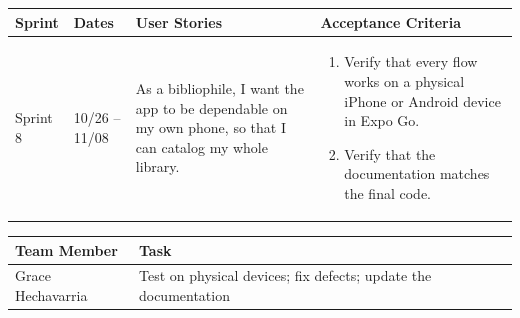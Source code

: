 \documentclass[12pt]{article}
\begin{document}
\noindent\begin{minipage}{\linewidth}

\vspace{0.5em}
\noindent
\begin{tabular}{|L{1.2cm}|L{1.8cm}|L{5.2cm}|L{6.3cm}|}
\hline
\textbf{Sprint} & \textbf{Dates} & \textbf{User Stories} & \textbf{Acceptance Criteria} \\
\hline
Sprint 8 & 10/26 -- 11/08 &
As a bibliophile, I want the app to be dependable on my own phone, so that I can catalog my whole library. &
\begin{enumerate}
    \item Verify that every flow works on a physical iPhone or Android device in Expo Go.
    \item Verify that the documentation matches the final code.
\end{enumerate} \\
\hline
\end{tabular}

\vspace{0.5em}
\noindent
\begin{tabular}{|L{3.4cm}|L{11.6cm}|}
\hline
\textbf{Team Member} & \textbf{Task} \\
\hline
Grace Hechavarria & Test on physical devices; fix defects; update the documentation \\
\hline
\end{tabular}
\end{minipage}

\vspace{1.5em}
\end{document}
